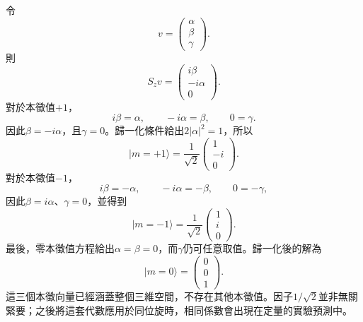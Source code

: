 令
\begin{equation}
v=
\begin{pmatrix}
\alpha\\
\beta\\
\gamma
\end{pmatrix}.
\end{equation}
則
\begin{equation}
S_zv
=
\begin{pmatrix}
i\beta\\
-i\alpha\\
0
\end{pmatrix}.
\end{equation}
對於本徵值\(+1\)，
\begin{equation}
i\beta=\alpha,
\qquad
-i\alpha=\beta,
\qquad
0=\gamma.
\end{equation}
因此\(\beta=-i\alpha\)，且\(\gamma=0\)。歸一化條件給出\(2|\alpha|^2=1\)，所以
\begin{equation}
|m=+1\rangle
=
\frac{1}{\sqrt2}
\begin{pmatrix}
1\\
-i\\
0
\end{pmatrix}.
\end{equation}
對於本徵值\(-1\)，
\begin{equation}
i\beta=-\alpha,
\qquad
-i\alpha=-\beta,
\qquad
0=-\gamma,
\end{equation}
因此\(\beta=i\alpha\)、\(\gamma=0\)，並得到
\begin{equation}
|m=-1\rangle
=
\frac{1}{\sqrt2}
\begin{pmatrix}
1\\
i\\
0
\end{pmatrix}.
\end{equation}
最後，零本徵值方程給出\(\alpha=\beta=0\)，而\(\gamma\)仍可任意取值。歸一化後的解為
\begin{equation}
|m=0\rangle
=
\begin{pmatrix}
0\\
0\\
1
\end{pmatrix}.
\end{equation}
這三個本徵向量已經涵蓋整個三維空間，不存在其他本徵值。因子\(1/\sqrt2\)並非無關緊要；之後將這套代數應用於同位旋時，相同係數會出現在定量的實驗預測中。

\begin{classroomqa}
\end{classroomqa}

